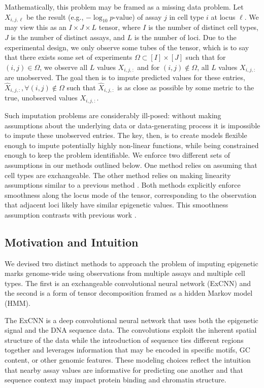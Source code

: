 \documentclass[11pt]{article}
\begin{document}
Mathematically, this problem may be framed as a missing data problem. Let $X_{i,j,\ell}$ be the result (e.g., $-\log_{10}p\text{-value}$) of assay $j$ in cell type $i$ at locus $\ell$. We may view this as an $I \times J \times L$ tensor, where $I$ is the number of distinct cell types, $J$ is the number of distinct assays, and $L$ is the number of loci. Due to the experimental design, we only observe some tubes of the tensor, which is to say that there exists some set of experiments $\Omega \subset [I] \times [J]$ such that for $(i, j) \in \Omega$, we observe all $L$ values $X_{i,j,:}$ and for $(i, j) \not\in \Omega$, all $L$ values $X_{i,j,:}$ are unobserved. The goal then is to impute predicted values for these entries, $\hat{X}_{i,j,:}, \forall (i,j) \not\in \Omega$ such that $\hat{X}_{i,j,:}$ is as close as possible by some metric to the true, unobserved values $X_{i,j,:}$.

Such imputation problems are considerably ill-posed: without making assumptions about the underlying data or data-generating process it is impossible to impute these unobserved entries. The key, then, is to create models flexible enough to impute potentially highly non-linear functions, while being constrained enough to keep the problem identifiable. We enforce two different sets of assumptions in our methods outlined below. One method relies on assuming that cell types are exchangeable. The other method relies on making linearity assumptions similar to a previous method \cite{durham2018predictd}. Both methods explicitly enforce smoothness along the locus mode of the tensor, corresponding to the observation that adjacent loci likely have similar epigenetic values. This smoothness assumption contrasts with previous work \cite{ernst2015large,durham2018predictd, schreiber2019multi}.

\subsection{Motivation and Intuition}

We devised two distinct methods to approach the problem of imputing epigenetic marks genome-wide using observations from multiple assays and multiple cell types. The first is an exchangeable convolutional neural network (ExCNN) and the second is a form of tensor decomposition framed as a hidden Markov model (HMM).

The ExCNN is a deep convolutional neural network that uses both the epigenetic signal and the DNA sequence data. The convolutions exploit the inherent spatial structure of the data while the introduction of sequence ties different regions together and leverages information that may be encoded in specific motifs, GC content, or other genomic features. These modeling choices reflect the intuition that nearby assay values are informative for predicting one another and that sequence context may impact protein binding and chromatin structure. 
\end{document}

